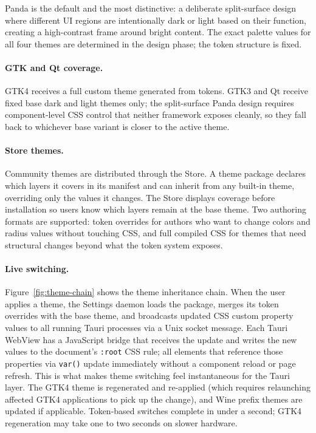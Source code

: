 Panda is the default and the most distinctive: a deliberate split-surface
design where different UI regions are intentionally dark or light based on
their function, creating a high-contrast frame around bright content. The
exact palette values for all four themes are determined in the design phase;
the token structure is fixed.

\paragraph{GTK and Qt coverage.}
GTK4 receives a full custom theme generated from tokens. GTK3 and Qt receive
fixed base dark and light themes only; the split-surface Panda design requires
component-level CSS control that neither framework exposes cleanly, so they
fall back to whichever base variant is closer to the active theme.

\paragraph{Store themes.}
Community themes are distributed through the Store. A theme package declares
which layers it covers in its manifest and can inherit from any built-in theme,
overriding only the values it changes. The Store displays coverage before
installation so users know which layers remain at the base theme. Two authoring
formats are supported: token overrides for authors who want to change colors and
radius values without touching CSS, and full compiled CSS for themes that need
structural changes beyond what the token system exposes.

\paragraph{Live switching.}
Figure~\ref{fig:theme-chain} shows the theme inheritance chain. When the user
applies a theme, the Settings daemon loads the package, merges its token
overrides with the base theme, and broadcasts updated CSS custom property values
to all running Tauri processes via a Unix socket message. Each Tauri WebView
has a JavaScript bridge that receives the update and writes the new values to
the document's \texttt{:root} CSS rule; all elements that reference those
properties via \texttt{var()} update immediately without a component reload or
page refresh. This is what makes theme switching feel instantaneous for the
Tauri layer. The GTK4 theme is regenerated and re-applied (which requires
relaunching affected GTK4 applications to pick up the change), and Wine prefix
themes are updated if applicable. Token-based switches complete in under a
second; GTK4 regeneration may take one to two seconds on slower hardware.

